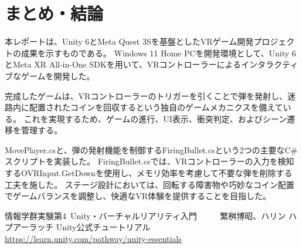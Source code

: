 \documentclass{jlreq}
\begin{document}
\section{まとめ・結論}
本レポートは、Unity 6とMeta Quest 3Sを基盤としたVRゲーム開発プロジェクトの成果を示すものである。
Windows 11 Home PCを開発環境として、Unity 6とMeta XR All-in-One SDKを用いて、VRコントローラーによるインタラクティブなゲームを開発した。

完成したゲームは、VRコントローラーのトリガーを引くことで弾を発射し、迷路内に配置されたコインを回収するという独自のゲームメカニクスを備えている。
これを実現するため、ゲームの進行、UI表示、衝突判定、およびシーン遷移を管理する。

MovePlayer.csと、弾の発射機能を制御するFiringBullet.csという2つの主要なC\#スクリプトを実装した。
FiringBullet.csでは、VRコントローラーの入力を検知するOVRInput.GetDownを使用し、メモリ効率を考慮して不要な弾を削除する工夫を施した。
ステージ設計においては、回転する障害物や巧妙なコイン配置でゲームバランスを調整し、快適なVR体験を提供することを目指した。


\begin{thebibliography}{9}
情報学群実験第4~Unity・バーチャルリアリティ入門 ~~~~~繁桝博昭、ハリン ハプアーラッチ
Unity公式チュートリアル\\
\url{https://learn.unity.com/pathway/unity-essentials}
\end{thebibliography}
\end{document}

